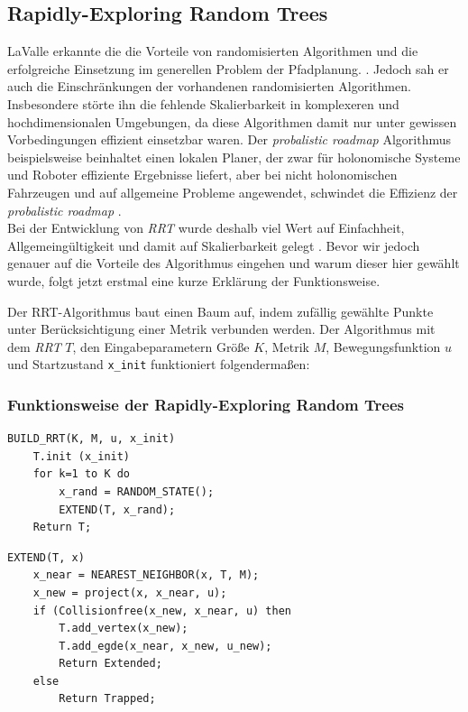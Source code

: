 \subsection{Rapidly-Exploring Random Trees}
\label{RRT}
LaValle erkannte die die Vorteile von randomisierten Algorithmen und die \glqq erfolgreiche Einsetzung im generellen Problem der Pfadplanung\grqq{}. \citep[Kap 1][]{Lav98}. Jedoch sah er auch die Einschränkungen der vorhandenen randomisierten Algorithmen. Insbesondere störte ihn die fehlende Skalierbarkeit in komplexeren und hochdimensionalen Umgebungen, da diese Algorithmen damit nur unter gewissen Vorbedingungen effizient einsetzbar waren. Der \textit{probalistic roadmap} Algorithmus \citep{AmWu96} beispielsweise beinhaltet einen \glqq lokalen Planer\grqq, der zwar für holonomische Systeme und Roboter effiziente Ergebnisse liefert, aber bei nicht holonomischen Fahrzeugen und auf allgemeine Probleme angewendet, schwindet die Effizienz der \textit{probalistic roadmap} \citep{Lav98} .\\
Bei der Entwicklung von \textit{RRT} wurde deshalb viel Wert auf Einfachheit, Allgemeingültigkeit und damit auf Skalierbarkeit gelegt \citep[vlg. Kap 3,][]{Lav98}. Bevor wir jedoch genauer auf die Vorteile des Algorithmus eingehen und warum dieser hier gewählt wurde, folgt jetzt erstmal eine kurze Erklärung der Funktionsweise. 

Der RRT-Algorithmus baut einen Baum auf, indem zufällig gewählte Punkte unter Berücksichtigung einer Metrik verbunden werden. Der Algorithmus mit dem \textit{RRT} $T$, den Eingabeparametern Größe $K$, Metrik $M$, Bewegungsfunktion $u$ und Startzustand \verb|x_init|  funktioniert folgendermaßen:

\subsubsection{Funktionsweise der Rapidly-Exploring Random Trees}
\lstset{language=Pascal, stepnumber=1, numbers=left}
\begin{lstlisting}
BUILD_RRT(K, M, u, x_init)
	T.init (x_init)
	for k=1 to K do
		x_rand = RANDOM_STATE();
		EXTEND(T, x_rand);
	Return T;
\end{lstlisting}
\begin{lstlisting}
EXTEND(T, x)
	x_near = NEAREST_NEIGHBOR(x, T, M);
	x_new = project(x, x_near, u);
	if (Collisionfree(x_new, x_near, u) then
		T.add_vertex(x_new);
		T.add_egde(x_near, x_new, u_new);
		Return Extended;
	else
		Return Trapped;
\end{lstlisting}

